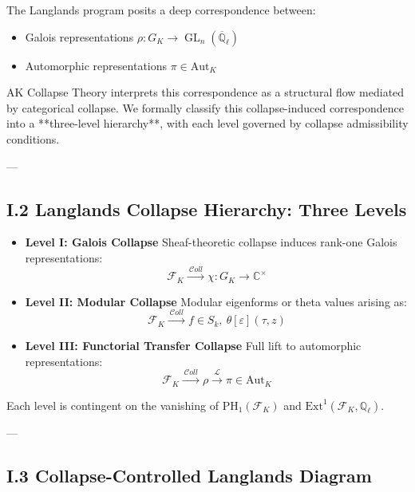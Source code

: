 \documentclass[11pt]{article}
\begin{document}
The Langlands program posits a deep correspondence between:

\begin{itemize}
  \item Galois representations \( \rho : G_K \to \operatorname{GL}_n(\overline{\mathbb{Q}}_\ell) \)
  \item Automorphic representations \( \pi \in \text{Aut}_K \)
\end{itemize}

AK Collapse Theory interprets this correspondence as a structural flow mediated by categorical collapse.  
We formally classify this collapse-induced correspondence into a **three-level hierarchy**, with each level governed by collapse admissibility conditions.

---

\subsection*{I.2 Langlands Collapse Hierarchy: Three Levels}

\begin{itemize}
  \item \textbf{Level I: Galois Collapse}  
  Sheaf-theoretic collapse induces rank-one Galois representations:
  \[
  \mathcal{F}_K \xrightarrow{\ \mathcal{C}oll\ } \chi : G_K \to \mathbb{C}^\times
  \]

  \item \textbf{Level II: Modular Collapse}  
  Modular eigenforms or theta values arising as:
  \[
  \mathcal{F}_K \xrightarrow{\ \mathcal{C}oll\ } f \in S_k,\ \theta[\varepsilon](\tau, z)
  \]

  \item \textbf{Level III: Functorial Transfer Collapse}  
  Full lift to automorphic representations:
  \[
  \mathcal{F}_K \xrightarrow{\ \mathcal{C}oll\ } \rho \xrightarrow{\mathcal{L}} \pi \in \text{Aut}_K
  \]
\end{itemize}

Each level is contingent on the vanishing of \( \mathrm{PH}_1(\mathcal{F}_K) \) and \( \mathrm{Ext}^1(\mathcal{F}_K, \mathbb{Q}_\ell) \).

---

\subsection*{I.3 Collapse-Controlled Langlands Diagram}

\begin{center}
\end{center}
\end{document}

